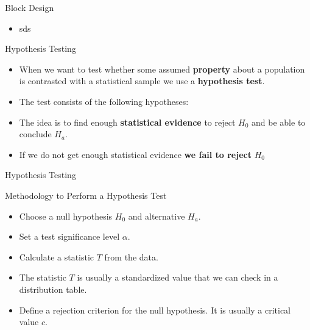 \documentclass[handout]{beamer}
\begin{document}
\begin{frame}{Block Design}
\scriptsize{

\begin{itemize}

 \item sds
  
\end{itemize}



} 
\end{frame}



\begin{frame}{Hypothesis Testing}
\scriptsize{
\begin{itemize}
 \item When we want to test whether some assumed \textbf{property} about a population is contrasted with a statistical sample we use a \textbf{hypothesis test}.
\item The test consists of the following hypotheses:
\item The idea is to find enough \textbf{statistical evidence} to reject $H_{0}$ and be able to conclude $H_{a}$.
\item If we do not get enough statistical evidence \textbf{we fail to reject} $H_{0}$

\end{itemize}



} 
\end{frame}



\begin{frame}{Hypothesis Testing}
\scriptsize{

\begin{block}{Methodology to Perform a Hypothesis Test}
\begin{itemize}
 \item Choose a null hypothesis $H_0$ and alternative $H_a$.
 \item Set a test significance level $\alpha$.
 \item Calculate a statistic $T$ from the data.
 \item  The statistic $T$ is usually a standardized value that we can check in a distribution table.
 \item Define a rejection criterion for the null hypothesis. It is usually a critical value $c$.
\end{itemize}
\end{block}



} 
\end{frame}
\end{document}

